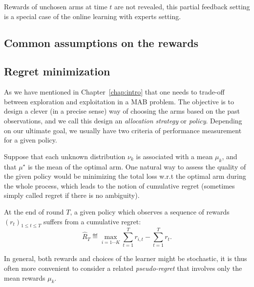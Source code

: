 \begin{remark}\label{remark:mab.partial}
\begin{leftbar}[remarkbar]
	Rewards of unchosen arms at time $t$ are not revealed, this partial feedback setting is a special case of the online learning with experts setting.
\end{leftbar}
\end{remark}

\subsection{Common assumptions on the rewards}\label{sec:mab.model.assumptions}

\subsection{Regret minimization}\label{sec:mab.model.regret}

As we have mentioned in Chapter~\ref{chap:intro} that one needs to trade-off between exploration and exploitation in a MAB problem. The objective is to design a clever (in a precise sense) way of choosing the arms based on the past observations, and we call this design an \emph{allocation strategy} or \emph{policy}. Depending on our ultimate goal, we usually have two criteria of performance measurement for a given policy.

Suppose that each unknown distribution $\nu_k$ is associated with a mean $\mu_k$, and that $\mu^{\star}$ is the mean of the optimal arm. One natural way to assess the quality of the given policy would be minimizing the total loss w.r.t the optimal arm during the whole process, which leads to the notion of \gls{cumulative regret} (sometimes simply called regret if there is no ambiguity).

\begin{definition}\label{def:mab.cumulative_regret}
\begin{leftbar}[defnbar]
	At the end of round $T$, a given policy which observes a sequence of rewards $(r_t)_{1 \leq t \leq T}$ suffers from a cumulative regret:
	\[
		\hat{R}_T \eqdef \max_{i=1\cdots K} \sum_{t=1}^T r_{i,t} - \sum_{t=1}^T r_t.
	\]
\end{leftbar}
\end{definition}

In general, both rewards and choices of the learner might be stochastic, it is thus often more convenient to consider a related \emph{pseudo-regret} that involves only the mean rewards $\mu_k$.

